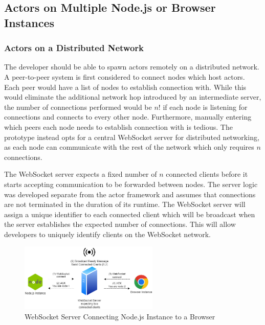 \documentclass[lettersize,journal]{IEEEtran}
\begin{document}
\subsection{Actors on Multiple Node.js or Browser Instances}
\subsubsection{Actors on a Distributed Network}
The developer should be able to spawn actors remotely on a distributed network. A peer-to-peer system is first considered to connect nodes which host actors. Each peer would have a list of nodes to establish connection with. While this would eliminate the additional network hop introduced by an intermediate server, the number of connections performed would be $n!$ if each node is listening for connections and connects to every other node. Furthermore, manually entering which peers each node needs to establish connection with is tedious. The prototype instead opts for a central WebSocket server for distributed networking, as each node can communicate with the rest of the network which only requires $n$ connections.

The WebSocket server expects a fixed number of $n$ connected clients before it starts accepting communication to be forwarded between nodes. The server logic was developed separate from the actor framework and assumes that connections are not terminated in the duration of its runtime. The WebSocket server will assign a unique identifier to each connected client which will be broadcast when the server establishes the expected number of connections. This will allow developers to uniquely identify clients on the WebSocket network.

\begin{figure}[H]
    \begin{centering}
        \includegraphics[width=250px]{resources/websocketconnection.png}
        \caption{WebSocket Server Connecting Node.js Instance to a Browser}\label{fig:websocketconnection}
    \end{centering}
\end{figure}
\end{document}
